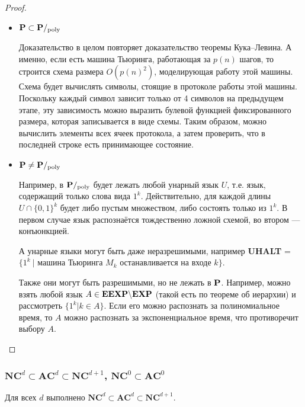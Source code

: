 \begin{proof}
\begin{itemize}

\item $\textbf{P} \subset \textbf{P}/_{\mathrm{poly}}$

    Доказательство в целом повторяет доказательство теоремы
Кука–Левина. А именно, если есть машина Тьюринга, работающая за $p(n)$ шагов, то строится схема размера $O(p(n)^2)$, моделирующая работу этой машины.
Схема будет вычислять символы, стоящие в протоколе работы этой машины. Поскольку каждый символ зависит только от 4 символов на предыдущем этапе,
эту зависимость можно выразить булевой функцией фиксированного размера,
которая записывается в виде схемы. Таким образом, можно вычислить элементы всех ячеек протокола, а затем проверить, что в последней строке есть
принимающее состояние.

\item $\textbf{P} \neq \textbf{P}/_{\mathrm{poly}}$

Например, в $\textbf{P}/_{\mathrm{poly}}$ будет лежать любой унарный язык $U$,
т.е. язык, содержащий только слова вида $1^k$. Действительно, для каждой длины $U \cap \{ 0, 1\}^k$ будет либо пустым множеством, либо состоять только из $1^k$. В первом случае язык распознаётся тождественно ложной схемой, во втором —
конъюнкцией.

А унарные языки могут быть даже неразрешимыми, например \newline \textbf{UHALT} = $\{1^k \ | \text{ машина Тьюринга }  M_k  \text{ останавливается на входе }k\}$. 

Также они могут быть разрешимыми, но не лежать в $\textbf{P}$. Например, можно взять любой язык $A \in \text{\textbf{EEXP}} \backslash \text{\textbf{EXP}}$ (такой есть по теореме об иерархии) и рассмотреть $\{1^k | k \in A \}$. Если его можно распознать за полиномиальное время, то $A$ можно распознать за экспоненциальное время, что противоречит выбору $A$.
\end{itemize}
\end{proof}

\subsubsection{$\mathbf{NC}^d \subset \mathbf{AC}^d \subset \mathbf{NC}^{d+1}$, $\mathbf{NC}^0 \subset \mathbf{AC}^0$}

\begin{statement}
    Для всех $d$ выполнено $\mathbf{NC}^d \subset \mathbf{AC}^d \subset \mathbf{NC}^{d+1}$.
\end{statement}

